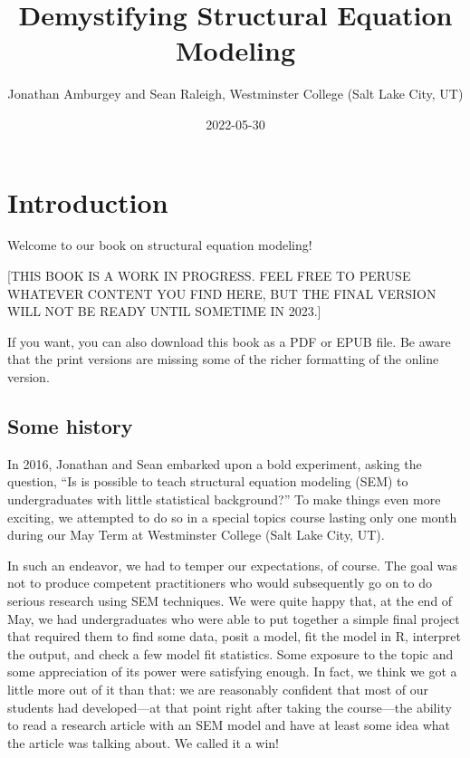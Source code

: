 \documentclass[
]{book}
\title{Demystifying Structural Equation Modeling}
\author{Jonathan Amburgey and Sean Raleigh, Westminster College (Salt Lake City, UT)}
\date{2022-05-30}
\begin{document}
\maketitle

{
\setcounter{tocdepth}{1}
\tableofcontents
}
\hypertarget{intro}{%
\chapter*{Introduction}\label{intro}}

Welcome to our book on structural equation modeling!

{[}THIS BOOK IS A WORK IN PROGRESS. FEEL FREE TO PERUSE WHATEVER CONTENT YOU FIND HERE, BUT THE FINAL VERSION WILL NOT BE READY UNTIL SOMETIME IN 2023.{]}

If you want, you can also download this book as a PDF or EPUB file. Be aware that the print versions are missing some of the richer formatting of the online version.

\hypertarget{intro-history}{%
\section*{Some history}\label{intro-history}}

In 2016, Jonathan and Sean embarked upon a bold experiment, asking the question, ``Is is possible to teach structural equation modeling (SEM) to undergraduates with little statistical background?'' To make things even more exciting, we attempted to do so in a special topics course lasting only one month during our May Term at Westminster College (Salt Lake City, UT).

In such an endeavor, we had to temper our expectations, of course. The goal was not to produce competent practitioners who would subsequently go on to do serious research using SEM techniques. We were quite happy that, at the end of May, we had undergraduates who were able to put together a simple final project that required them to find some data, posit a model, fit the model in R, interpret the output, and check a few model fit statistics. Some exposure to the topic and some appreciation of its power were satisfying enough. In fact, we think we got a little more out of it than that: we are reasonably confident that most of our students had developed---at that point right after taking the course---the ability to read a research article with an SEM model and have at least some idea what the article was talking about. We called it a win!
\end{document}
